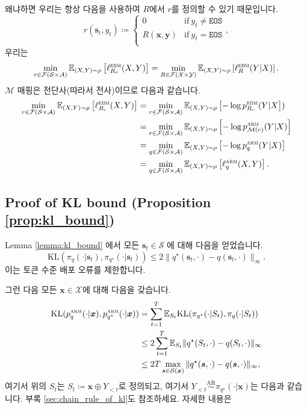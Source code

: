 \documentclass{article}
\def\s{{\bm{s}}}
\def\x{{\bm{x}}}
\def\y{{\bm{y}}}
\def\EE{{\mathbb{E}}}
\def\cA{{\mathcal{A}}}
\def\cF{{\mathcal{F}}}
\def\cM{{\mathcal{M}}}
\def\cS{{\mathcal{S}}}
\def\cX{{\mathcal{X}}}
\def\cY{{\mathcal{Y}}}
\newcommand{\Rsub}[1]{R_{#1}}
\def\arm{{\textsc{arm}}}
\def\ebm{{\textsc{ebm}}}
\def\KL{{\mathrm{KL}}}
\def\eos{\texttt{EOS}\xspace}
\def\augvoc{\cA}
\def\arsim{\overset{\text{AR}}{\sim}}
\begin{document}
왜냐하면 우리는 항상 다음을 사용하여 $R$에서 $r$를 정의할 수 있기 때문입니다.
 \begin{equation} 
r( \s _t, y_t) \coloneqq 
 \begin{cases} 
0 & \mbox{if} ~ y_t \neq \eos \\
R( \x , \y ) & \mbox{if} ~ y_t = \eos \\
 \end{cases},
 \label{eq:R_from_r} 
 \end{equation} 
우리는
 \begin{equation} 
 \min _{r \in \cF ( \cS \times \augvoc )} 
 \EE _{(X,Y) \sim \rho } \left [ \ell ^ \ebm _{ \Rsub{r} }(X, Y) \right ]
=
 \min _{R \in \cF ( \cX \times \cY )} 
 \EE _{(X,Y) \sim \rho } \left [ \ell ^ \ebm _{R}(Y|X) \right ].
 \end{equation} 
$\cM$ 매핑은 전단사(따라서 전사)이므로 다음과 같습니다.
 \begin{align} 
 \min _{r \in \cF ( \cS \times \augvoc )} 
 \EE _{(X,Y) \sim \rho } \left [ \ell ^ \ebm _{ \Rsub{r} }(X, Y) \right ]
&=
 \min _{r \in \cF ( \cS \times \augvoc )} 
 \EE _{(X,Y) \sim \rho } \left [ - \log p^ \ebm _{ \Rsub{r} }(Y|X \right ]) \\
&=
 \min _{r \in \cF ( \cS \times \augvoc )} 
 \EE _{(X,Y) \sim \rho } \left [ - \log p^ \arm _{ \cM (r)}(Y|X) \right ] \\
&=
 \min _{q \in \cF ( \cS \times \augvoc )} 
 \EE _{(X,Y) \sim \rho } \left [ - \log p^ \arm _q(Y|X) \right ] \\
&=
 \min _{q \in \cF ( \cS \times \augvoc )} 
 \EE _{(X,Y) \sim \rho } \left [ \ell ^ \arm _q(X, Y) \right ].
 \end{align}

\subsection{Proof of KL bound (Proposition \ref{prop:kl_bound})} 
 \label{proof:kl_bound}

Lemma \ref{lemma:kl_bound} 에서 모든 $\s_t \in \cS$ 에 대해 다음을 얻었습니다.
 \begin{equation} 
 \KL ( \pi _q( \cdot | \s _t), \pi _{q^ \star }( \cdot | \s _t))
 \le 
2 \|q^ \star ( \s _t, \cdot ) - q( \s _t, \cdot )\|_ \infty .
 \end{equation} 
이는 토큰 수준 배포 오류를 제한합니다.

그런 다음 모든 $\x \in \cX$에 대해 다음을 갖습니다.
 \begin{align} 
 \KL (p^ \arm _q( \cdot | \x ), p^ \arm _{q^ \star }( \cdot | \x ))
&= \sum _{t=1}^T
 \EE _{S_t} \KL ( \pi _{q^ \star }( \cdot |S_t), \pi _q( \cdot |S_t)) \\
& \le  
2 \sum _{t=1}^T
 \EE _{S_t} \|q^ \star (S_t, \cdot ) - q(S_t, \cdot )\|_ \infty \\
& \le 2T \max _{ \s \in \cS ( \x )} \|q^ \star ( \s , \cdot ) - q( \s , \cdot )\|_ \infty ,
 \end{align} 
여기서 위의 $S_t$는 $S_t \coloneqq \x \oplus Y_{<t}$로 정의되고, 여기서 $Y_{<t}
\arsim \pi_{q^\star}(\cdot|\x)$는 다음과 같습니다.  부록 \ref{sec:chain_rule_of_kl}도 참조하세요. 
자세한 내용은
\end{document}

